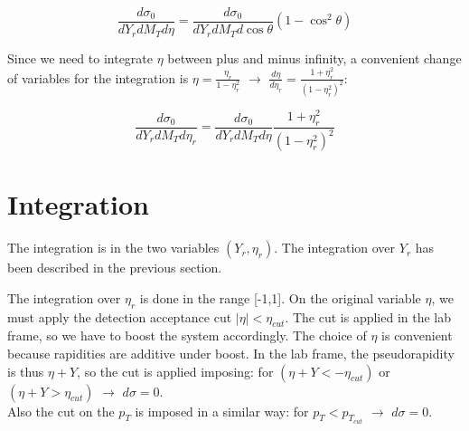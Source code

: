 \documentclass{article}
\begin{document}
\begin{equation}
 \frac{d\sigma_0}{dY_r dM_T d\eta} = \frac{d\sigma_0}{dY_r dM_T d\cos\theta} (1 - \cos^2\theta)
\end{equation}

Since we need to integrate $\eta$ between plus and minus infinity, a convenient change of variables for the integration is $\eta = \frac{\eta_r}{1 - \eta_r^2}$ $\longrightarrow$ $\frac{d\eta}{d\eta_r} = \frac{1 + \eta_r^2}{(1 - \eta_r^2)^2}$:

\begin{equation}
 \frac{d\sigma_0}{dY_r dM_T d\eta_r} = \frac{d\sigma_0}{dY_r dM_T d\eta} \frac{1 + \eta_r^2}{(1 - \eta_r^2)^2}
\end{equation}

\section{Integration}

The integration is in the two variables $(Y_r, \eta_r)$.
The integration over $Y_r$ has been described in the previous section.

The integration over $\eta_r$ is done in the range [-1,1].
On the original variable $\eta$, we must apply the detection acceptance cut $|\eta| < \eta_{cut}$.
The cut is applied in the lab frame, so we have to boost the system accordingly.
The choice of $\eta$ is convenient because rapidities are additive under boost.
In the lab frame, the pseudorapidity is thus $\eta + Y$, so the cut is applied imposing: for $(\eta + Y < -\eta_{cut})$ or $(\eta + Y > \eta_{cut})$ $\longrightarrow$ $d\sigma = 0$.\\

Also the cut on the $p_T$ is imposed in a similar way: for $p_T < p_{T_{cut}}$ $\longrightarrow$ $d\sigma = 0$.
\end{document}

